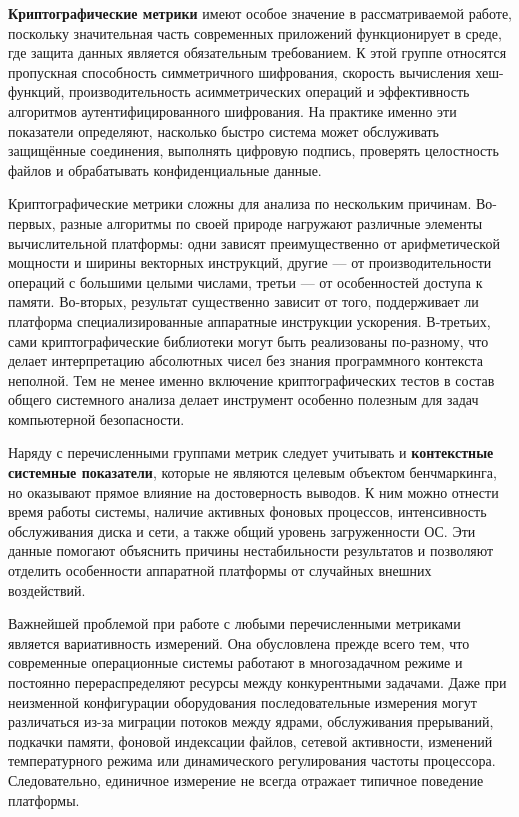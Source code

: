 \textbf{Криптографические метрики} имеют особое значение в рассматриваемой работе, поскольку значительная часть современных приложений функционирует в среде, где защита данных является обязательным требованием. К этой группе относятся пропускная способность симметричного шифрования, скорость вычисления хеш-функций, производительность асимметрических операций и эффективность алгоритмов аутентифицированного шифрования. На практике именно эти показатели определяют, насколько быстро система может обслуживать защищённые соединения, выполнять цифровую подпись, проверять целостность файлов и обрабатывать конфиденциальные данные.

Криптографические метрики сложны для анализа по нескольким причинам. Во-первых, разные алгоритмы по своей природе нагружают различные элементы вычислительной платформы: одни зависят преимущественно от арифметической мощности и ширины векторных инструкций, другие --- от производительности операций с большими целыми числами, третьи --- от особенностей доступа к памяти. Во-вторых, результат существенно зависит от того, поддерживает ли платформа специализированные аппаратные инструкции ускорения. В-третьих, сами криптографические библиотеки могут быть реализованы по-разному, что делает интерпретацию абсолютных чисел без знания программного контекста неполной. Тем не менее именно включение криптографических тестов в состав общего системного анализа делает инструмент особенно полезным для задач компьютерной безопасности.

Наряду с перечисленными группами метрик следует учитывать и \textbf{контекстные системные показатели}, которые не являются целевым объектом бенчмаркинга, но оказывают прямое влияние на достоверность выводов. К ним можно отнести время работы системы, наличие активных фоновых процессов, интенсивность обслуживания диска и сети, а также общий уровень загруженности ОС. Эти данные помогают объяснить причины нестабильности результатов и позволяют отделить особенности аппаратной платформы от случайных внешних воздействий.

Важнейшей проблемой при работе с любыми перечисленными метриками является вариативность измерений. Она обусловлена прежде всего тем, что современные операционные системы работают в многозадачном режиме и постоянно перераспределяют ресурсы между конкурентными задачами. Даже при неизменной конфигурации оборудования последовательные измерения могут различаться из-за миграции потоков между ядрами, обслуживания прерываний, подкачки памяти, фоновой индексации файлов, сетевой активности, изменений температурного режима или динамического регулирования частоты процессора. Следовательно, единичное измерение не всегда отражает типичное поведение платформы.

